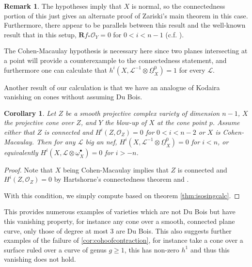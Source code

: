 \documentclass[proquest]{uwthesis}[2014/11/13]
\newtheorem{cor}[theorem]{Corollary}
\theoremstyle{definition}
\newtheorem{remark}[theorem]{Remark}
\newcommand{\LL}{\mathcal{L}}
\newcommand{\OO}{\mathcal{O}}
\newcommand{\bR}{\textbf{R}}
\newcommand{\DB}{\underline{\Omega}}
\newcommand{\db}{\underline{\omega}^\bullet}
\begin{document}
\begin{remark}
The hypotheses imply that $X$ is normal, so the connectedness portion of this just gives an alternate proof of Zariski's main theorem in this case.
Furthermore, there appear to be parallels between this result and the well-known result that in this setup, $\bR f_* \OO_Y = 0$ for $0 < i < n - 1$ (c.f. \cite[Lemma~3.3]{Kovacs1999}).
\end{remark}

The Cohen-Macaulay hypothesis is necessary here since two planes intersecting at a point will provide a counterexample to the connectedness statement, and furthermore one can calculate that $h^i(X, \LL^{-1} \otimes \DB_X^0) = 1$ for every $\LL$.

Another result of our calculation is that we have an analogue of Kodaira vanishing on cones without assuming Du Bois.

\begin{cor}
	Let $Z$ be a smooth projective complex variety of dimension $n-1$, $X$ the projective cone over $Z$, and $Y$ the blow-up of $X$ at the cone point $p$.
	Assume either that $Z$ is connected and $H^i(Z, \OO_Z) = 0$ for $0 < i < n-2$ or $X$ is Cohen-Macaulay.
	Then for any $\LL$ big an nef, $H^i(X, \LL^{-1} \otimes \DB_X^0) = 0$ for $i < n$, or equivalently $H^i(X, \LL \otimes \db_X) = 0$ for $i > -n$.
\end{cor}
\begin{proof}
	Note that $X$ being Cohen-Macaulay implies that $Z$ is connected and $H^i(Z, \OO_Z) = 0$ by Hartshorne's connectedness theorem and \cite[Lemma 4.3]{Patakfalvi2013}.
	
	With this condition, we simply compute based on theorem \ref{thm:isosingcalc}.
\end{proof}

This provides numerous examples of varieties which are not Du Bois but have this vanishing property, for instance any cone over a smooth, connected plane curve, only those of degree at most 3 are Du Bois.
This also suggests further examples of the failure of \ref{cor:cohoofcontraction}, for instance take a cone over a surface ruled over a curve of genus $g \geq 1$, this has non-zero $h^1$ and thus this vanishing does not hold.

{}

\end{document}
